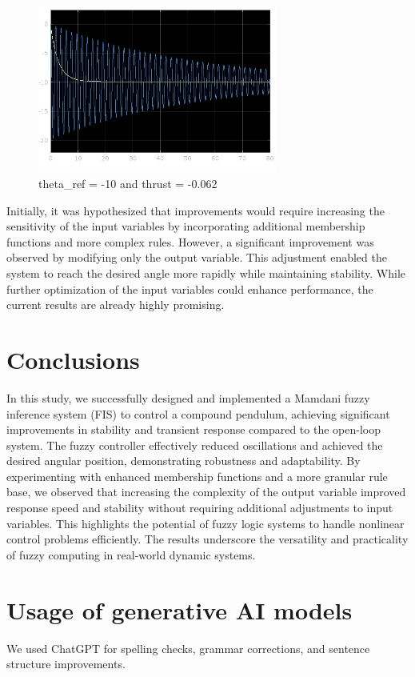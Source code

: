 \documentclass[12pt]{article}
\begin{document}
\begin{figure}[h!]
    \centering
    \includegraphics[width=0.7\textwidth]{complex2.jpg}
    \caption{theta\_ref = -10 and thrust = -0.062}
    \label{fig:complex2}
\end{figure}

Initially, it was hypothesized that improvements would require increasing the sensitivity of the input variables by incorporating additional membership functions and more complex rules. However, a significant improvement was observed by modifying only the output variable. This adjustment enabled the system to reach the desired angle more rapidly while maintaining stability. While further optimization of the input variables could enhance performance, the current results are already highly promising.

\section{Conclusions}  

    In this study, we successfully designed and implemented a Mamdani fuzzy inference system (FIS) to control a compound pendulum, achieving significant improvements in stability and transient response compared to the open-loop system. The fuzzy controller effectively reduced oscillations and achieved the desired angular position, demonstrating robustness and adaptability. By experimenting with enhanced membership functions and a more granular rule base, we observed that increasing the complexity of the output variable improved response speed and stability without requiring additional adjustments to input variables. This highlights the potential of fuzzy logic systems to handle nonlinear control problems efficiently. The results underscore the versatility and practicality of fuzzy computing in real-world dynamic systems.

\section{Usage of generative AI models}

We used ChatGPT for spelling checks, grammar corrections, and sentence structure improvements. 
\end{document}
